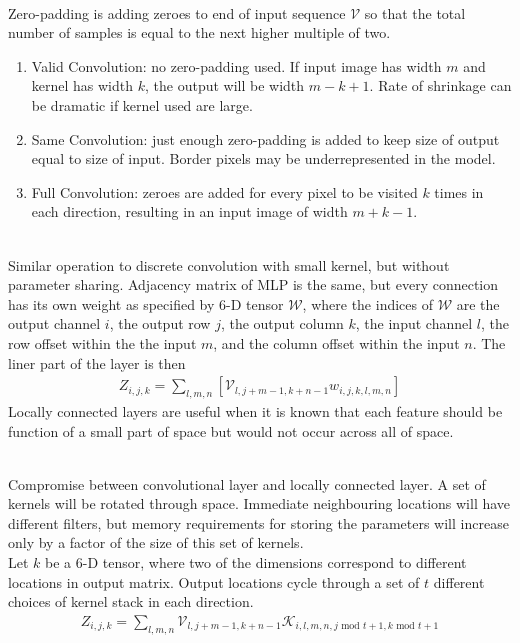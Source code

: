\begin{remark} \\
Zero-padding is adding zeroes to end of input sequence $\mathcal{V}$ so that the total number of samples is equal to the next higher multiple of two.
\begin{enumerate}[label=\roman*.]
\setlength{\itemsep}{0pt}
\item Valid Convolution: no zero-padding used. If input image has width $m$ and kernel has width $k$, the output will be width $m-k+1$. Rate of shrinkage can be dramatic if kernel used are large.
\item Same Convolution: just enough zero-padding is added to keep size of output equal to size of input. Border pixels may be underrepresented in the model.
\item Full Convolution: zeroes are added for every pixel to be visited $k$ times in each direction, resulting in an input image of width $m+k-1$.
\end{enumerate}
\end{remark}

\begin{remark} \\
Similar operation to discrete convolution with small kernel, but without parameter sharing. Adjacency matrix of MLP is the same, but every connection has its own weight as specified by $6$-D tensor $\mathcal{W}$, where the indices of $\mathcal{W}$ are the output channel $i$, the output row $j$, the output column $k$, the input channel $l$, the row offset within the the input $m$, and the column offset within the input $n$. The liner part of the layer is then
\begin{align*}
Z_{i,j,k} = \sum\limits_{l,m,n} [\mathcal{V}_{l, j+m-1, k+n-1} w_{i,j,k,l,m,n}] \nonumber
\end{align*}
Locally connected layers are useful when it is known that each feature should be function of a small part of space but would not occur across all of space.
\end{remark}

\begin{remark} \\
Compromise between convolutional layer and locally connected layer. A set of kernels will be rotated through space. Immediate neighbouring locations will have different filters, but memory requirements for storing the parameters will increase only by a factor of the size of this set of kernels.\\
Let $k$ be a $6$-D tensor, where two of the dimensions correspond to different locations in output matrix. Output locations cycle through a set of $t$ different choices of kernel stack in each direction.
\begin{align*}
Z_{i,j,k} = \sum\limits_{l,m,n} \mathcal{V}_{l, j+m-1, k+n-1} \mathcal{K}_{i,l,m,n, j \text{ mod } t + 1, k \text{ mod } t + 1} \nonumber
\end{align*}  
\end{remark}



